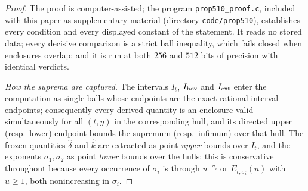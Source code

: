 \documentclass[11pt]{article}
\theoremstyle{definition}
\begin{document}
\begin{proof}
The proof is computer-assisted; the program
\texttt{prop510\_proof.c}, included with this paper as
supplementary material (directory \texttt{code/prop510}),
establishes every
condition and every displayed constant of the statement. It reads
no stored data; every decisive comparison is a strict ball
inequality, which fails closed when enclosures overlap; and it is
run at both $256$ and $512$ bits of precision with identical
verdicts.

\emph{How the suprema are captured.} The intervals $I_t$,
$I_{\rm box}$ and $I_{\rm ext}$ enter the computation as single
balls whose endpoints are the exact rational interval endpoints;
consequently every derived quantity is an enclosure valid
simultaneously for all $(t,y)$ in the corresponding hull, and its
directed upper (resp.\ lower) endpoint bounds the supremum (resp.\
infimum) over that hull. The frozen quantities $\widehat\delta$ and
$\widehat k$ are extracted as point \emph{upper} bounds over $I_t$,
and the exponents $\sigma_1,\sigma_2$ as point \emph{lower} bounds
over the hulls; this is conservative throughout because every
occurrence of $\sigma_i$ is through $u^{-\sigma_i}$ or
$E_{t,\sigma_i}(u)$ with $u\ge1$, both nonincreasing in $\sigma_i$.


\end{proof}
\end{document}
